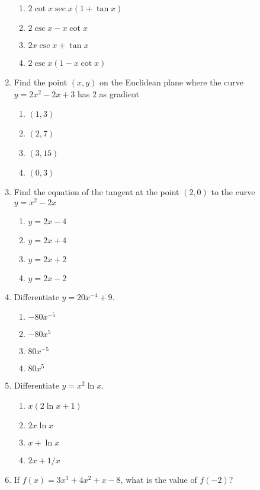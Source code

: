\begin{multicols}{2}
\begin{enumerate}[label={\arabic*.}]
\begin{enumerate}[label={\Alph*.}]
        \item \(2\cot{x}\sec{x}(1 + \tan{x})\)
        \item \(2\csc{x} - x{\cot{x}}\)
        \item \(2x\csc{x} + \tan{x}\)
        \item \(2\csc{x}(1 - x{\cot{x}})\)
      \end{enumerate}
    \item Find the point \((x, y)\) on the Euclidean plane where the curve \(y = 2{x}^{2} - 2x + 3\) has \(2\) as gradient
      \begin{enumerate}[label={\Alph*.}]
        \item \((1, 3)\)
        \item \((2, 7)\)
        \item \((3, 15)\)
        \item \((0, 3)\)
      \end{enumerate}
    \item Find the equation of the tangent at the point \((2, 0)\) to the curve \(y = {x}^{2} - 2x\)
      \begin{enumerate}[label={\Alph*.}]
        \item \(y = 2x - 4\)
        \item \(y = 2x + 4\)
        \item \(y = 2x + 2\)
        \item \(y = 2x - 2\)
      \end{enumerate}
    \item Differentiate \(y = 20{x}^{-4} + 9\).
      \begin{enumerate}[label={\Alph*.}]
        \item \(-80{x}^{-5}\)
        \item \(-80{x}^{5}\)
        \item \(80{x}^{-5}\)
        \item \(80{x}^{5}\)
      \end{enumerate}
    \item Differentiate \(y = x^2 \ln x\).
      \begin{enumerate}[label={\Alph*.}]
        \item \(x(2\ln x + 1)\)
        \item \(2x \ln x\)
        \item \(x + \ln x\)
        \item \(2x + 1/x\)
      \end{enumerate}
    \item If \(f(x) = 3x^3 + 4x^2 + x - 8\), what is the value of \(f(-2)\)?

\end{enumerate}
\end{multicols}
